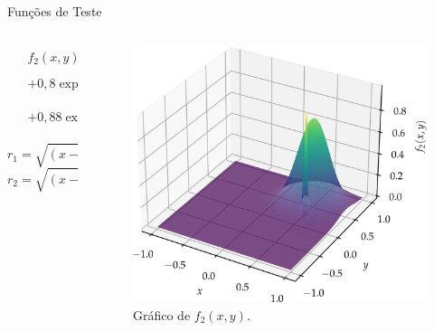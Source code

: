 \begin{frame}{Funções de Teste}
  \begin{columns}
    \begin{column}{0.5\textwidth}
      \begin{align*}
        \begin{split}
          & f_2(x,y) = \\
          & + 0,8 \exp\left\{-\frac{r_1^2}{(0,3)^2}\right\} \\
          & + 0,88 \exp\left\{-\frac{r_2^2}{(0,03)^2}\right\} \\
        \end{split}
      \end{align*}
      $$ r_1 = \sqrt{
          \left(x - 0,5\right)^2 +
          \left(y - 0,5\right)^2
        }
      $$
      $$ r_2 = \sqrt{
          \left(x - 0,6\right)^2 +
          \left(y - 0,1\right)^2
        }
      $$
    \end{column}
    \begin{column}{0.5\textwidth}
      \begin{figure}
        \centering
        \includegraphics[width=\textwidth]{imagens/graph_near_gaussians.png}
        \caption{Gráfico de $f_2(x,y)$.}
      \end{figure}
    \end{column}
  \end{columns}
\end{frame}

